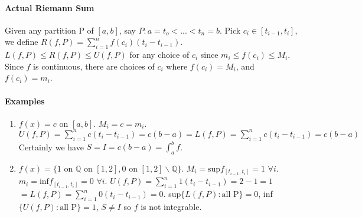 \documentclass[10pt,letter]{article}
\begin{document}
\paragraph{Actual Riemann Sum}
Given any partition P of $[a,b]$, say $P:a=t_o<...<t_n=b$. Pick $c_i\in[t_{i-1},t_i]$, we define $R(f,P)=\sum_{i=1}^nf(c_i)(t_i-t_{i-1})$. $L(f,P)\leq R(f,P)\leq U(f,P)$ for any choice of $c_i$ since $m_i\leq f(c_i)\leq M_i$. Since $f$ is continuous, there are choices of $c_i$ where $f(c_i)=M_i$, and $f(c_i)=m_i$. 

\paragraph{Examples}
\begin{enumerate}
    \item $f(x)=c$ on $[a,b]$. $M_i=c=m_i$. $U(f,P)=\sum_{i=1}^nc(t_i-t_{i-1})=c(b-a)=L(f,P)=\sum_{i=1}^nc(t_i-t_{i-1})=c(b-a)$ Certainly we have $S=I=c(b-a)=\int_a^bf$. 
    \item $f(x)=\{\text{1 on }\mathbb{Q}\text{ on }[1,2], \text{0 on }[1,2]\backslash\mathbb{Q}\}$. $M_i=\text{sup}f_{[t_{i-1},t_i]} = 1$ $\forall i$. $m_i=\text{inf}f_{[t_{i-1},t_i]} = 0$ $\forall i$. $U(f,P)=\sum_{i=1}^n1(t_i-t_{i-1})=2-1=1$ $=L(f,P)=\sum_{i=1}^n0(t_i-t_{i-1})=0$. sup$\{L(f,P): \text{all P}\} = 0$, inf$\{U(f,P): \text{all P}\} = 1$, $S\neq I$ so $f$ is not integrable. 
\end{enumerate}
\end{document}
